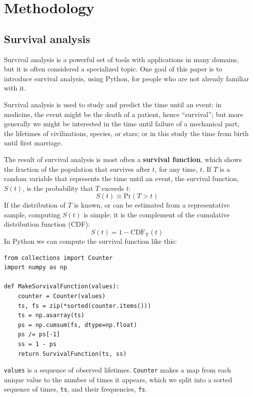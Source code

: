 \documentclass[journal]{IEEEtran}
\begin{document}
\section{Methodology}


\subsection{Survival analysis}

Survival analysis is a powerful set of tools with applications in many
domains, but it is often considered a specialized topic.
One goal of this paper is to introduce survival analysis, using Python,
for people who are not already familiar with it.

Survival analysis is used to study and predict the time until an event: in
medicine, the event might be the death of a patient, hence ``survival'';
but more generally we might be interested in the time until failure
of a mechanical part, the lifetimes of civilizations, species, or
stars; or in this study the time from birth until first marriage.

The result of survival analysis is most often a {\bf survival function},
which shows the fraction of the population that survives after $t$,
for any time, $t$.  If $T$ is a random variable that represents the
time until an event, the survival function, $S(t)$, is the
probability that $T$ exceeds $t$:
%
\begin{equation}
S(t) \equiv \mathrm{Pr}(T > t)
\end{equation}
%
If the distribution of $T$ is known, or can be estimated from a
representative sample, computing $S(t)$ is simple: it is the
complement of the cumulative distribution function (CDF):
%
\begin{equation}
S(t) = 1 - \mathrm{CDF_T}(t)
\end{equation}
%
In Python we can compute the survival function like this:

\begin{verbatim}
from collections import Counter
import numpy as np

def MakeSurvivalFunction(values):
    counter = Counter(values)
    ts, fs = zip(*sorted(counter.items()))
    ts = np.asarray(ts)
    ps = np.cumsum(fs, dtype=np.float)
    ps /= ps[-1]
    ss = 1 - ps
    return SurvivalFunction(ts, ss)
\end{verbatim}

{\tt values} is a sequence of observed lifetimes.  {\tt Counter}
makes a map from each unique value to the number of times it
appears, which we split into a sorted sequence of times, {\tt ts}, and
their frequencies, {\tt fs}.
\end{document}
